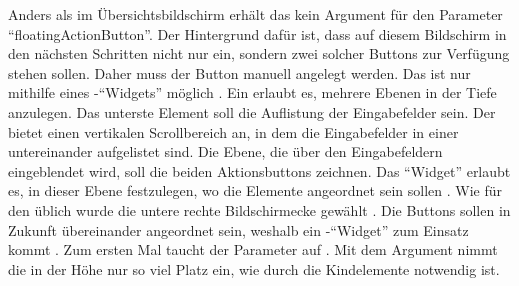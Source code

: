 Anders als im Übersichtsbildschirm erhält das  kein Argument für den Parameter \enquote{floatingActionButton}.
Der Hintergrund dafür ist, dass auf diesem Bildschirm in den nächsten Schritten nicht nur ein, sondern zwei solcher Buttons zur Verfügung stehen sollen.
Daher muss der Button manuell angelegt werden.
Das ist nur mithilfe eines -\enquote{Widgets} möglich .
Ein  erlaubt es, mehrere Ebenen in der Tiefe anzulegen.
Das unterste Element soll die Auflistung der Eingabefelder sein.
Der   bietet einen vertikalen Scrollbereich an, in dem die Eingabefelder in einer   untereinander aufgelistet sind.
Die Ebene, die  über den Eingabefeldern eingeblendet wird, soll die beiden Aktionsbuttons zeichnen.
Das \enquote{Widget}  erlaubt es, in dieser Ebene festzulegen, wo die Elemente angeordnet sein sollen .
Wie für den  üblich wurde die untere rechte Bildschirmecke gewählt .
Die Buttons sollen in Zukunft übereinander angeordnet sein, weshalb ein -\enquote{Widget} zum Einsatz kommt .
Zum ersten Mal taucht der Parameter  auf .
Mit dem Argument  nimmt die  in der Höhe nur so viel Platz ein,
wie durch die Kindelemente notwendig ist.


